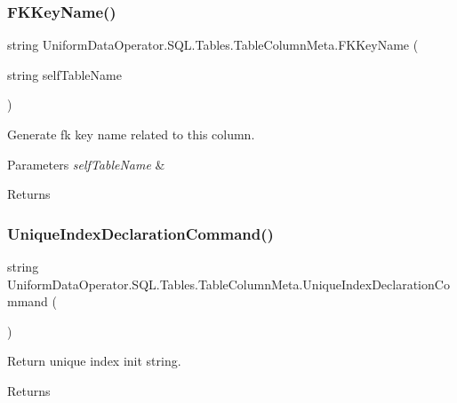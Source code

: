 \subsubsection{\texorpdfstring{F\+K\+Key\+Name()}{FKKeyName()}}
{\footnotesize\ttfamily string Uniform\+Data\+Operator.\+S\+Q\+L.\+Tables.\+Table\+Column\+Meta.\+F\+K\+Key\+Name (\begin{DoxyParamCaption}\item[{string}]{self\+Table\+Name }\end{DoxyParamCaption})}



Generate fk key name related to this column. 


\begin{DoxyParams}{Parameters}
{\em self\+Table\+Name} & \\
\hline
\end{DoxyParams}
\begin{DoxyReturn}{Returns}

\end{DoxyReturn}
\mbox{\label{struct_uniform_data_operator_1_1_s_q_l_1_1_tables_1_1_table_column_meta_af0156c8b36f305d3715cd87d8b6c4d17}} 
\subsubsection{\texorpdfstring{Unique\+Index\+Declaration\+Command()}{UniqueIndexDeclarationCommand()}}
{\footnotesize\ttfamily string Uniform\+Data\+Operator.\+S\+Q\+L.\+Tables.\+Table\+Column\+Meta.\+Unique\+Index\+Declaration\+Command (\begin{DoxyParamCaption}{ }\end{DoxyParamCaption})}



Return unique index init string. 

\begin{DoxyReturn}{Returns}

\end{DoxyReturn}


